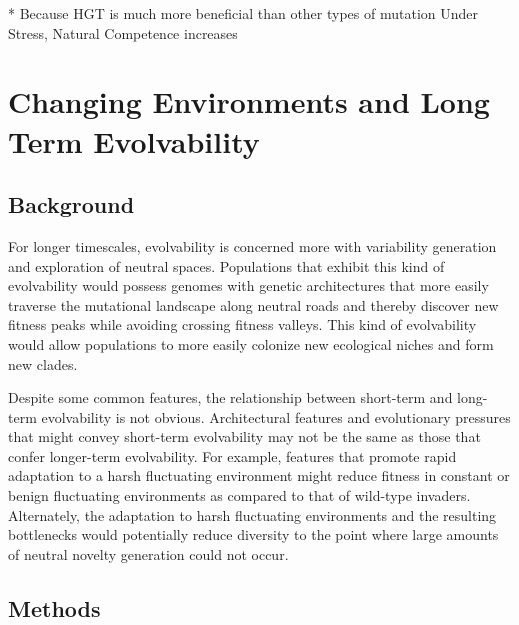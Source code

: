 \documentclass[PhD]{msu-thesis}
\begin{document}
* Because HGT is much more beneficial than other types of mutation
Under Stress, Natural Competence increases





\chapter{Changing Environments and Long Term Evolvability}
\label{chap:ce-longterm}
\section{Background}

For longer timescales, evolvability is concerned more with variability generation and exploration of neutral spaces. Populations that exhibit this kind of evolvability would possess genomes with genetic architectures that more easily traverse the mutational landscape along neutral roads and thereby discover new fitness peaks while avoiding crossing fitness valleys. This kind of evolvability would allow populations to more easily colonize new ecological niches and form new clades\cite{kirschner_evolvability_1998,brookfield_evolution:_2001}.

Despite some common features, the relationship between short-term and long-term evolvability is not obvious. Architectural features and evolutionary pressures that might convey short-term evolvability may not be the same as those that confer longer-term evolvability\cite{pigliucci_is_2008}. For example, features that promote rapid adaptation to a harsh fluctuating environment might reduce fitness in constant or benign fluctuating environments as compared to that of wild-type invaders. Alternately, the adaptation to harsh fluctuating environments and the resulting bottlenecks would potentially reduce diversity to the point where large amounts of neutral novelty generation could not occur.



\section{Methods}
\end{document}
